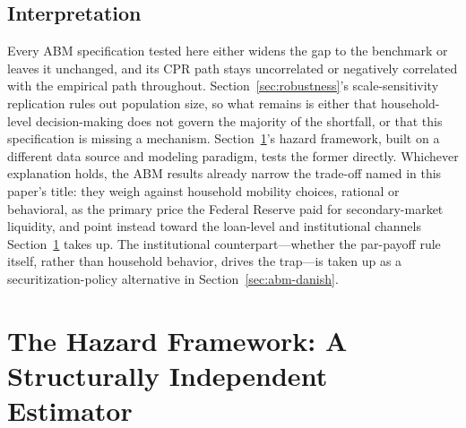 \documentclass[12pt]{article}
\begin{document}
\subsection{Interpretation}\label{sec:abm-interp}

Every ABM specification tested here either widens the gap to the benchmark or leaves it unchanged, and its CPR path stays uncorrelated or negatively correlated with the empirical path throughout. Section~\ref{sec:robustness}'s scale-sensitivity replication rules out population size, so what remains is either that household-level decision-making does not govern the majority of the shortfall, or that this specification is missing a mechanism. Section~\ref{sec:hazard}'s hazard framework, built on a different data source and modeling paradigm, tests the former directly. Whichever explanation holds, the ABM results already narrow the trade-off named in this paper's title: they weigh against household mobility choices, rational or behavioral, as the primary price the Federal Reserve paid for secondary-market liquidity, and point instead toward the loan-level and institutional channels Section~\ref{sec:hazard} takes up. The institutional counterpart---whether the par-payoff rule itself, rather than household behavior, drives the trap---is taken up as a securitization-policy alternative in Section~\ref{sec:abm-danish}.

\section{The Hazard Framework: A Structurally Independent Estimator}\label{sec:hazard}
\end{document}

